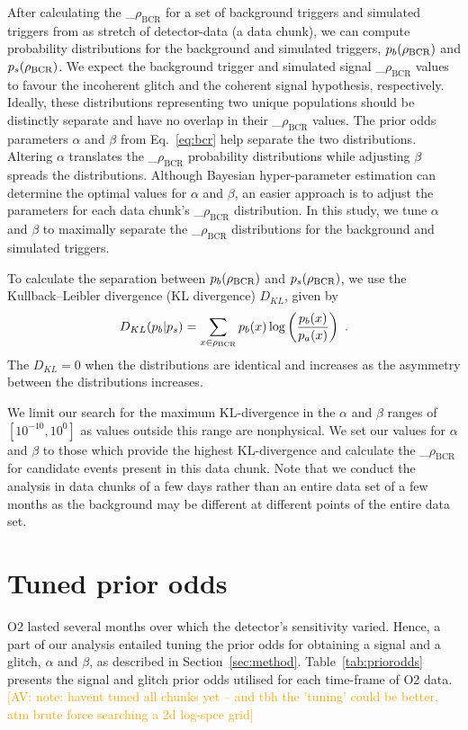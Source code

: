 \documentclass[%
 nofootinbib,
 amsmath,amssymb,
 aps,
 twocolumn
]{revtex4-2}
\newcommand{\mathcmd}[1]{{\sc \relax\ifmmode#1\else $#1$\fi}\xspace}
\newcommand{\bcr}{\mathcmd{\rho_\text{BCR}}}
\newcommand{\av}[1]{\textcolor{orange}{[AV: #1]}}
\begin{document}
After calculating the \bcr for a set of background triggers and simulated triggers from as stretch of detector-data (a data chunk), we can compute probability distributions for the background and simulated triggers, $p_b(\bcr)$ and $p_s(\bcr)$. We expect the background trigger and simulated signal \bcr values to favour the incoherent glitch and the coherent signal hypothesis, respectively. Ideally, these distributions representing two unique populations should be distinctly separate and have no overlap in their \bcr values. The prior odds parameters $\alpha$ and $\beta$ from Eq.~\ref{eq:bcr} help separate the two distributions. Altering $\alpha$ translates the \bcr probability distributions while adjusting $\beta$ spreads the distributions. Although Bayesian hyper-parameter estimation can determine the optimal values for $\alpha$ and $\beta$, an easier approach is to adjust the parameters for each data chunk's \bcr distribution. In this study, we tune $\alpha$ and $\beta$ to maximally separate the \bcr distributions for the background and simulated triggers. 

To calculate the separation between $p_b(\bcr)$ and $p_s(\bcr)$, we use the Kullback--Leibler divergence (KL divergence) $D_{KL}$, given by
\begin{equation}
    D_{KL}(p_b | p_s) = \sum\limits_{x\in \bcr} p_b(x) \log \left( \frac{p_b(x)}{p_a(x)} \right)  \ .
\end{equation}
The $D_{KL}=0$ when the distributions are identical and increases as the asymmetry between the distributions increases. 

We limit our search for the maximum KL-divergence in the $\alpha$ and $\beta$ ranges of $[10^{-10}, 10^0]$ as values outside this range are nonphysical. We set our values for $\alpha$ and $\beta$ to those which provide the highest KL-divergence and calculate the \bcr for candidate events present in this data chunk. Note that we conduct the analysis in data chunks of a few days rather than an entire data set of a few months as the background may be different at different points of the entire data set.




\section{Tuned prior odds}\label{apdx:alphabeta}

O2 lasted several months over which the detector's sensitivity varied. Hence, a part of our analysis entailed tuning the prior odds for obtaining a signal and a glitch, $\alpha$ and $\beta$, as described in Section~\ref{sec:method}. Table~\ref{tab:priorodds} presents the signal and glitch prior odds utilised for each time-frame of O2 data. \av{note: havent tuned all chunks yet -- and tbh the 'tuning' could be better, atm brute force searching a 2d log-spce grid}

\end{document}
